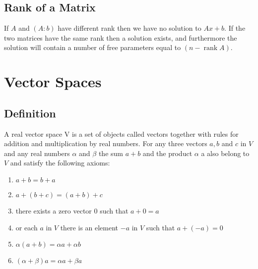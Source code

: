 \documentclass[12pt,a4paper,fleqn]{mycalc}
\begin{document}
	\subsection{Rank of a Matrix}
	\begin{tcolorbox}
		If \( A \) and \( (A : b) \) have different rank then we have no solution to \( Ax+b. \) If the two matrices have the same rank then a solution exists, and furthermore the solution will contain a number of free parameters equal to \( (n - \operatorname{rank} A). \)
	\end{tcolorbox}
	\section{Vector Spaces}
	\subsection{Definition}
	A real vector space V is a set of objects called vectors together with rules for addition and multiplication by real numbers. For any three vectors \( a, b \) and \( c \) in \( V \) and any real numbers \(\alpha\) and \(\beta\) the sum \( a + b \) and the product \(\alpha\) a also belong to \( V \) and satisfy the following axioms:
	\begin{enumerate}[a]
		\item \( a+b=b+a \)
		\item \( a+(b+c)=(a+b)+c \)
		\item there exists a zero vector 0 such that \( a+0=a \)
		\item or each \( a \) in \( V \) there is an element \( -a \) in \( V \) such that \( a+(-a)=0 \)
		\item \( \alpha (a + b) = \alpha a + \alpha b \)
		\item \( (\alpha + \beta)a = \alpha a + \beta a \)
	\end{enumerate}
\end{document}
